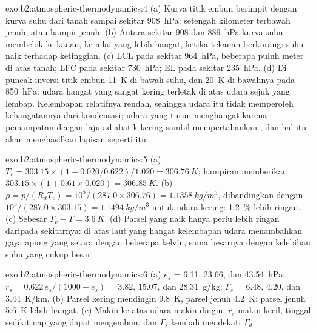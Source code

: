 \begin{solution}{exo:b2:atmospheric-thermodynamics:4}
(a) Kurva titik embun berimpit dengan kurva suhu dari tanah sampai sekitar \qty{908}{hPa}:
setengah kilometer terbawah jenuh, atau hampir jenuh. (b) Antara sekitar 908 dan \qty{889}{hPa}
kurva suhu membelok ke kanan, ke nilai yang lebih hangat, ketika tekanan berkurang: suhu
naik terhadap ketinggian. (c) LCL pada sekitar \qty{964}{hPa}, beberapa puluh meter di atas tanah; LFC pada
sekitar \qty{730}{hPa}; EL pada sekitar \qty{235}{hPa}. (d) Di puncak inversi titik embun
\qty{11}{K} di bawah suhu, dan \qty{20}{K} di bawahnya pada \qty{850}{hPa}: udara hangat yang sangat kering
terletak di atas udara sejuk yang lembap. Kelembapan relatifnya rendah, sehingga udara itu tidak memperoleh
kehangatannya dari kondensasi; udara yang turun menghangat karena pemampatan dengan laju adiabatik kering sambil
mempertahankan , dan hal itu akan menghasilkan lapisan seperti itu.
\end{solution}

\begin{solution}{exo:b2:atmospheric-thermodynamics:5}
(a) $T_v = 303.15 \times (1 + 0.020/0.622)/1.020 = \qty{306.76}{K}$; hampiran memberikan
$303.15 \times (1 + 0.61 \times 0.020) = \qty{306.85}{K}$. (b) $\rho = p/(R_dT_v) = 10^5/(287.0
\times 306.76) = \qty{1.1358}{kg/m^3}$, dibandingkan dengan $10^5/(287.0 \times 303.15) =
\qty{1.1494}{kg/m^3}$ untuk udara kering: \qty{1.2}{\percent} lebih ringan. (c) Sebesar $T_v - T =
\qty{3.6}{K}$. (d) Parsel yang naik hanya perlu lebih ringan daripada sekitarnya: di atas laut yang hangat
kelembapan udara menambahkan gaya apung yang setara dengan beberapa kelvin, sama besarnya dengan kelebihan
suhu yang cukup besar.
\end{solution}

\begin{solution}{exo:b2:atmospheric-thermodynamics:6}
(a) $e_s$ = 6.11, 23.66, dan \qty{43.54}{hPa}; $r_s = 0.622\,e_s/(1000 - e_s)$ = 3.82, 15.07, dan
\qty{28.31}{g/kg}; $\Gamma_s$ = 6.48, 4.20, dan \qty{3.44}{K/km}. (b) Parsel kering mendingin
\qty{9.8}{K}, parsel jenuh \qty{4.2}{K}: parsel jenuh \qty{5.6}{K} lebih hangat.
(c) Makin ke atas udara makin dingin, $r_s$ makin kecil, tinggal sedikit uap yang dapat mengembun, dan
$\Gamma_s$ kembali mendekati $\Gamma_d$.
\end{solution}

